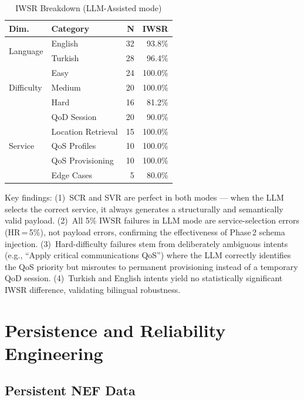 \documentclass[conference]{IEEEtran}
\begin{document}
\begin{table}[H]
\centering
\caption{IWSR Breakdown (LLM-Assisted mode)}
\label{tab:breakdown}
\small
\begin{tabular}{llrr}
\toprule
\textbf{Dim.} & \textbf{Category} & \textbf{N} & \textbf{IWSR} \\
\midrule
\multirow{2}{*}{Language}
  & English & 32 & 93.8\% \\
  & Turkish & 28 & 96.4\% \\
\midrule
\multirow{3}{*}{Difficulty}
  & Easy   & 24 & 100.0\% \\
  & Medium & 20 & 100.0\% \\
  & Hard   & 16 &  81.2\% \\
\midrule
\multirow{5}{*}{Service}
  & QoD Session       & 20 &  90.0\% \\
  & Location Retrieval & 15 & 100.0\% \\
  & QoS Profiles      & 10 & 100.0\% \\
  & QoS Provisioning  & 10 & 100.0\% \\
  & Edge Cases        &  5 &  80.0\% \\
\bottomrule
\end{tabular}
\end{table}

Key findings: (1)~SCR and SVR are perfect in both modes — when the
LLM selects the correct service, it always generates a
structurally and semantically valid payload.
(2)~All 5\% IWSR failures in LLM mode are service-selection errors
(HR\,=\,5\%), not payload errors, confirming the effectiveness of
Phase\,2 schema injection.
(3)~Hard-difficulty failures stem from deliberately ambiguous intents
(e.g., ``Apply critical communications QoS'') where the LLM correctly
identifies the QoS priority but misroutes to permanent provisioning
instead of a temporary QoD session.
(4)~Turkish and English intents yield no statistically significant
IWSR difference, validating bilingual robustness.

\section{Persistence and Reliability Engineering}

\subsection{Persistent NEF Data}
\end{document}
